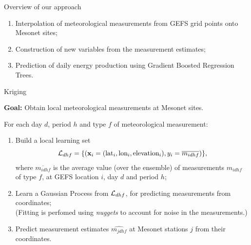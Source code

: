 \documentclass[handout]{beamer}
\begin{document}

\begin{frame}{Overview of our approach}

\begin{enumerate}
\item Interpolation of meteorological measurements from GEFS grid points onto Mesonet sites;
\item Construction of new variables from the measurement estimates;
\item Prediction of daily energy production using Gradient Boosted Regression Trees.
\end{enumerate}

\end{frame}



\begin{frame}{Kriging}

\textbf{Goal:} Obtain local meteorological measurements at Mesonet sites.

\vskip0.25cm

For each day $d$, period $h$ and type $f$ of meteorological measurement:

\begin{enumerate}

\item Build a local learning set $${\cal L}_{dhf} = \{ (\mathbf{x}_i =
(\text{lat}_i, \text{lon}_i, \text{elevation}_i), y_i = \overline{m_{idhf}} )
\},$$  where $\overline{m_{idhf}}$ is the average value (over the ensemble) of
measurements $m_{idhf}$ of type $f$, at GEFS location $i$, day $d$ and period
$h$;

\item Learn a Gaussian Process from ${\cal L}_{dhf}$, for predicting
measurements from coordinates;\\
{\scriptsize(Fitting is perfomed using \textit{nuggets} to account for noise in the measurements.)}

\item Predict measurement estimates $\widehat{m_{jdhf}}$ at Mesonet stations
$j$ from their coordinates.

\end{enumerate}

\end{frame}

\end{document}
